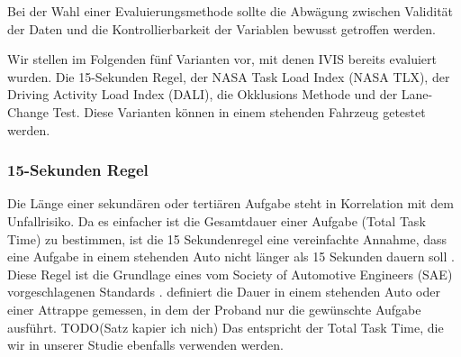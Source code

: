 Bei der Wahl einer Evaluierungsmethode sollte die Abwägung zwischen Validität der Daten und die Kontrollierbarkeit der Variablen bewusst getroffen werden.

Wir stellen im Folgenden fünf Varianten vor, mit denen IVIS bereits evaluiert wurden. Die 15-Sekunden Regel, der NASA Task Load Index (NASA TLX), der Driving Activity Load Index (DALI), die Okklusions Methode und der Lane-Change Test. 
Diese Varianten können in einem stehenden Fahrzeug getestet werden. 

\subsubsection{15-Sekunden Regel}
Die Länge einer sekundären oder tertiären Aufgabe steht in Korrelation mit dem Unfallrisiko. Da es einfacher ist die Gesamtdauer einer Aufgabe (Total Task Time) zu bestimmen, ist die 15 Sekundenregel eine vereinfachte Annahme, dass eine Aufgabe in einem stehenden Auto nicht länger als 15 Sekunden dauern soll \citep{green199915}. 
Diese Regel ist die Grundlage eines vom Society of Automotive Engineers (SAE) vorgeschlagenen Standards \citep{green1999sae}. 
\citet{green1999sae} definiert die Dauer in einem stehenden Auto oder einer Attrappe gemessen, in dem der Proband nur die gewünschte Aufgabe ausführt. TODO(Satz kapier ich nich)
Das entspricht der Total Task Time, die wir in unserer Studie ebenfalls verwenden werden.

